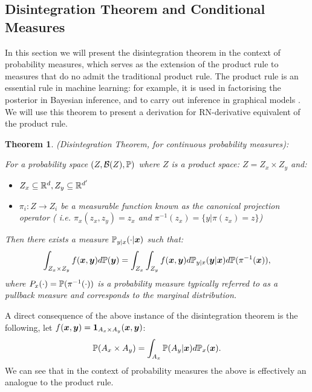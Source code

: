 \documentclass[a4paper,12pt,twoside,openright]{report}
\newtheorem{theorem}{Theorem}
\theoremstyle{definition}
\begin{document}
\subsection{Disintegration Theorem and Conditional Measures}

In this section we will present the disintegration theorem in the context of probability measures, which serves as the extension of the product rule to measures that do no admit the traditional product rule. The product rule is an essential rule in machine learning: for example, it is used in factorising the posterior in Bayesian inference, and to carry out inference in graphical models \citep{koller2009probabilistic}. We will use this theorem to present a derivation for RN-derivative equivalent of the product rule.

\begin{theorem} (Disintegration Theorem, for continuous probability measures): 

For a probability space $(Z, \calB(Z) ,\P)$ where $Z$ is a product space: $Z = Z_x \times Z_y$ and:
\begin{itemize}
    \item  $Z_x \subseteq \R^d, Z_y \subseteq \R^{d'}$
    \item  $\pi_i: Z \rightarrow Z_i$ be a measurable function known as the canonical projection operator ( i.e. $\pi_x(z_x,z_y) = z_x$ and $\pi^{-1}(z_x) = \{y | \pi(z_x) = z\}$)
\end{itemize}
Then there exists a measure $\P_{y|x}(\cdot | \vx)$ such that:
  \begin{align}
      \int_{Z_x \times Z_y} f(\vx, \vy) d\P(\vy) = \int_{Z_x}\int_{Z_y} f(\vx,\vy) d\P_{y|x}(\vy | \vx) d\P(\pi^{-1}(\vx)),
  \end{align}
 where $P_x(\cdot) = \P(\pi^{-1}(\cdot))$  is a probability measure typically referred to as a pullback measure and corresponds to the marginal distribution.
\end{theorem}

A direct consequence of the above instance of the disintegration theorem is the following, let $f(\vx,\vy) = \ind_{A_x \times A_y}(\vx,\vy)$:
\begin{align}
    \P(A_x \times A_y) = \int_{A_x}\P(A_y | \vx) d\P_x(\vx).
\end{align}
 We can see that in the context of probability measures the above is effectively an analogue to the product rule.
\end{document}
